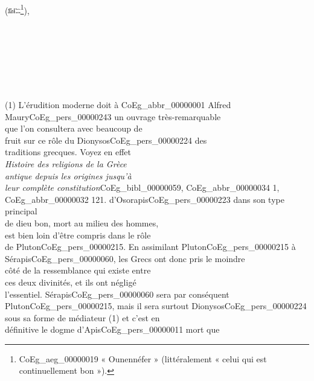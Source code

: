 \documentclass{book}
\begin{document}
{\begin{paracol}{2}
\noindent \\
 (\includegraphics[height=6pt]{CoEg_Mariette_hiero_1857-04-01_26.png}\footnote{\foreignlanguage{translit}{\gls{CoEg_aeg_00000019}} « Ounennéfer » (littéralement « celui qui est continuellement bon »).}),\\
\\
\\
\\
\\
\\
\\
\\
(1) L’érudition moderne doit à \gls{CoEg_abbr_00000001} Alfred\\
Maury\gls{CoEg_pers_00000243} un ouvrage très-remarquable\\
que l’on consultera avec beaucoup de\\
fruit sur ce rôle du Dionysos\gls{CoEg_pers_00000224} des\\
traditions grecques. Voyez en effet\\
\textit{Histoire des religions de la Grèce\\
antique depuis les origines jusqu’à\\
leur complète constitution}\gls{CoEg_bibl_00000059}, \gls{CoEg_abbr_00000034} 1,\\
\gls{CoEg_abbr_00000032} 121.
\switchcolumn
\noindent d’Osorapis\gls{CoEg_pers_00000223} dans son type principal\\
de dieu bon, mort au milieu des hommes,\\
est bien loin d’être compris dans le rôle\\
de Pluton\gls{CoEg_pers_00000215}. En assimilant Pluton\gls{CoEg_pers_00000215} à\\
Sérapis\gls{CoEg_pers_00000060}, les Grecs ont donc pris le moindre\\
côté de la ressemblance qui existe entre\\
ces deux divinités, et ils ont négligé\\
l’essentiel. Sérapis\gls{CoEg_pers_00000060} sera par conséquent\\
Pluton\gls{CoEg_pers_00000215}, mais il sera surtout Dionysos\gls{CoEg_pers_00000224}\\
sous sa forme de médiateur (1) et c’est en\\
définitive le dogme d’Apis\gls{CoEg_pers_00000011} mort que\\

\end{paracol}}
\end{document}

